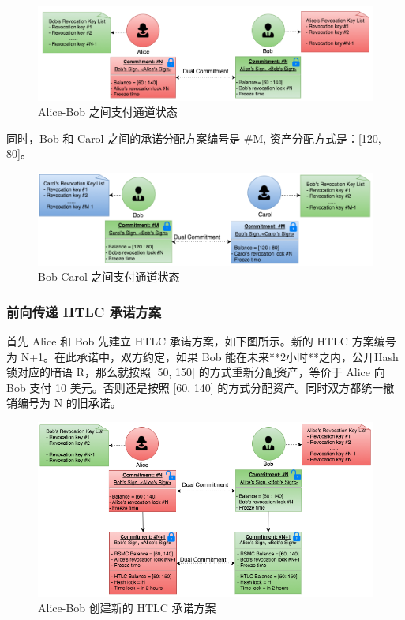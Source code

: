 \begin{figure}[h!]
    \centering
    \includegraphics[width=12cm, keepaspectratio]{../images/alice_bob_1.png}
    \caption{Alice-Bob 之间支付通道状态}
    \label{fig:alice_bob_1}
\end{figure}

同时，Bob 和 Carol 之间的承诺分配方案编号是 \#M, 资产分配方式是：[120, 80]。

\begin{figure}[h!]
    \centering
    \includegraphics[width=12cm, keepaspectratio]{../images/bob_carol_1.png}
    \caption{Bob-Carol 之间支付通道状态}
    \label{fig:bob_carol_1}
\end{figure}

\subsubsection{前向传递 HTLC 承诺方案}
首先 Alice 和 Bob 先建立 HTLC 承诺方案，如下图所示。新的 HTLC 方案编号为 N+1。在此承诺中，双方约定，如果 Bob 能在未来**2小时**之内，公开Hash 锁对应的暗语 R，那么就按照 [50, 150] 的方式重新分配资产，等价于 Alice 向 Bob 支付 10 美元。否则还是按照 [60, 140] 的方式分配资产。同时双方都统一撤销编号为 N 的旧承诺。

\begin{figure}[h!]
    \centering
    \includegraphics[width=12cm, keepaspectratio]{../images/alice_bob_2.png}
    \caption{Alice-Bob 创建新的 HTLC 承诺方案}
    \label{fig:alice_bob_2}
\end{figure}

